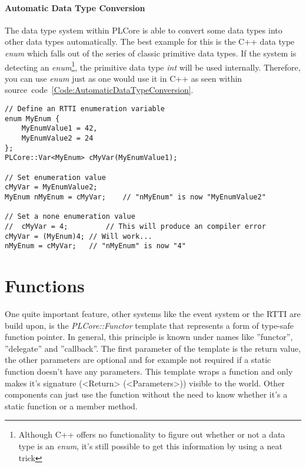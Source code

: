 \paragraph{Automatic Data Type Conversion}
The data type system within PLCore is able to convert some data types into other data types automatically. The best example for this is the C++ data type \emph{enum} which falls out of the series of classic primitive data types. If the system is detecting an \emph{enum}\footnote{Although C++ offers no functionality to figure out whether or not a data type is an \emph{enum}, it's still possible to get this information by using a neat trick}, the primitive data type \emph{int} will be used internally. Therefore, you can use \emph{enum} just as one would use it in C++ as seen within source~code~\ref{Code:AutomaticDataTypeConversion}.
\begin{lstlisting}[float=htb,label=Code:AutomaticDataTypeConversion,caption={Automatic data type conversion}]
// Define an RTTI enumeration variable
enum MyEnum {
	MyEnumValue1 = 42,
	MyEnumValue2 = 24
};
PLCore::Var<MyEnum> cMyVar(MyEnumValue1); 

// Set enumeration value
cMyVar = MyEnumValue2;
MyEnum nMyEnum = cMyVar;	// "nMyEnum" is now "MyEnumValue2"

// Set a none enumeration value
//	cMyVar = 4;			// This will produce an compiler error
cMyVar = (MyEnum)4;	// Will work...
nMyEnum = cMyVar;	// "nMyEnum" is now "4"
\end{lstlisting}




\section{Functions}
One quite important feature, other systems like the event system or the RTTI are build upon, is the \emph{PLCore::Functor} template that represents a form of type-safe function pointer. In general, this principle is known under names like ''functor'', ''delegate'' and ''callback''. The first parameter of the template is the return value, the other parameters are optional and for example not required if a static function doesn't have any parameters.  This template wraps a function and only makes it's signature (<Return> (<Parameters>)) visible to the world. Other components can just use the function without the need to know whether it's a static function or a member method.


